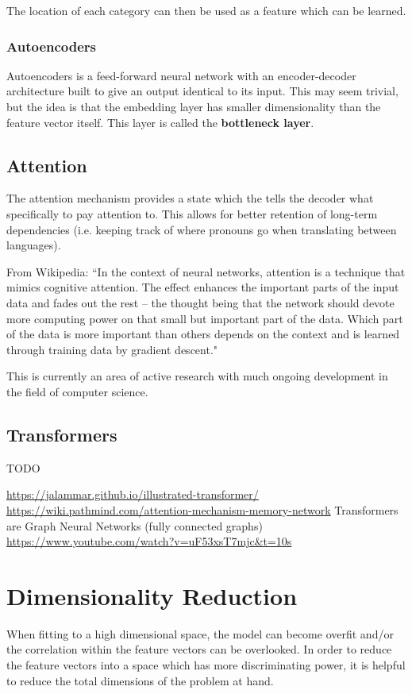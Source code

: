 The location of each category can then be used as a feature which can be learned.

\subsubsection{Autoencoders}

Autoencoders is a feed-forward neural network with an encoder-decoder architecture built to give an output identical to its input. This may seem trivial, but the idea is that the embedding layer has smaller dimensionality than the feature vector itself. This layer is called the \textbf{bottleneck layer}.

\subsection{Attention}

The attention mechanism provides a state which the tells the decoder what specifically to pay attention to. This allows for better retention of long-term dependencies (i.e. keeping track of where pronouns go when translating between languages).

From Wikipedia: ``In the context of neural networks, attention is a technique that mimics cognitive attention. The effect enhances the important parts of the input data and fades out the rest -- the thought being that the network should devote more computing power on that small but important part of the data. Which part of the data is more important than others depends on the context and is learned through training data by gradient descent."

This is currently an area of active research with much ongoing development in the field of computer science.


\subsection{Transformers}
TODO

\url{https://jalammar.github.io/illustrated-transformer/}\\
\url{https://wiki.pathmind.com/attention-mechanism-memory-network}
Transformers are Graph Neural Networks (fully connected graphs)
\url{https://www.youtube.com/watch?v=uF53xsT7mjc&t=10s}

\section{Dimensionality Reduction}\label{dim_red}
When fitting to a high dimensional space, the model can become overfit and/or the correlation within the feature vectors can be overlooked. In order to reduce the feature vectors into a space which has more discriminating power, it is helpful to reduce the total dimensions of the problem at hand.
